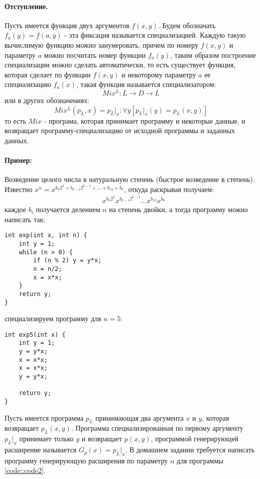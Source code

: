 \paragraph{Отступление.} Пусть имеется функция двух аргументов $f\left(x,y\right)$. Будем обозначать $f_a\left(y\right) = f\left(a,y\right)$ - эта фиксация
называется специализацией. Каждую такую вычислимую функцию можно занумеровать, причем по номеру $f\left(x,y\right)$ и параметру $a$ можно посчитать номер функции
$f_a\left(y\right)$, таким образом построение специализации можно сделать автоматически, то есть существует функция, которая сделает по функции $f\left(x,y\right)$
и некоторому параметру $a$ ее специализацию $f_a\left(x\right)$, такая функция называется специализатором: $$ Mix^L : L \rightarrow D \rightarrow L $$ или в других
обозначениях: $$ Mix^L\left(p_L, x\right) = p_L |_x : \forall y \left[p_L|_x \left(y\right) = p_L\left(x,y\right) \right] $$ то есть $Mix$ - програма, которая
принимает программу и некоторые данные, и возвращает программу-специализацию от исходной программы и заданных данных.

\paragraph{Пример:} Возведение целого числа в натуральную степень (быстрое возведение в степень). Известно $x^n = x^{b_k2^k + b_{k-1}2^{k-1} + ... + b_12 + b_0}$,
откуда раскрывая получаем:
\[
	\begin{split}
		&x^{b_k2^k}x^{b_{k-1}2^{k-1}}...x^{b_12}x^{b_0}
	\end{split}
\]
каждое $b_i$ получается делением $n$ на степень двойки, а тогда программу можно написать так:
\begin{lstlisting}
int exp(int x, int n) {
	int y = 1;
	while (n > 0) {
		if (n % 2) y = y*x;
		n = n/2;
		x = x*x;
	}
	return y;
}
\end{lstlisting}
\label{code::code2}
специализируем программу для $n=5$:
\begin{lstlisting}
int exp5(int x) {
	int y = 1;
	y = y*x;
	x = x*x;
	x = x*x;
	y = y*x;
	
	return y;
}
\end{lstlisting}

Пусть имеется программа $p_L$ принимающая два аргумента $x$ и $y$, которая возвращает $p_L\left(x,y\right)$. Программа специализированная по первому аргументу
$p_L |_x$ принимает только $y$ и возвращает $p\left(x,y\right)$, программой генерирующей расширение называется $G_p\left(x\right) = p_L |_x$. В домашнем задании
требуется написать программу генерирующую расширения по параметру $n$ для программы \ref{code::code2}.